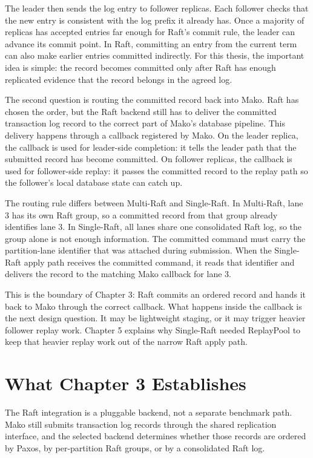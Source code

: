 The leader then sends the log entry to follower replicas. Each follower checks
that the new entry is consistent with the log prefix it already has. Once a
majority of replicas has accepted entries far enough for Raft's commit rule,
the leader can advance its commit point. In Raft, committing an entry from the
current term can also make earlier entries committed indirectly. For this
thesis, the important idea is simple: the record becomes committed only after
Raft has enough replicated evidence that the record belongs in the agreed log.

The second question is routing the committed record back into Mako. Raft has
chosen the order, but the Raft backend still has to deliver the committed
transaction log record to the correct part of Mako's database pipeline. This
delivery happens through a callback registered by Mako. On the leader replica,
the callback is used for leader-side completion: it tells the leader path that
the submitted record has become committed. On follower replicas, the callback
is used for follower-side replay: it passes the committed record to the replay
path so the follower's local database state can catch up.

The routing rule differs between Multi-Raft and Single-Raft. In Multi-Raft,
lane 3 has its own Raft group, so a committed record from that group already
identifies lane 3. In Single-Raft, all lanes share one consolidated Raft log,
so the group alone is not enough information. The committed command must carry
the partition-lane identifier that was attached during submission. When the
Single-Raft apply path receives the committed command, it reads that identifier
and delivers the record to the matching Mako callback for lane 3.

This is the boundary of Chapter 3: Raft commits an ordered record and hands it
back to Mako through the correct callback. What happens inside the callback is
the next design question. It may be lightweight staging, or it may trigger
heavier follower replay work. Chapter 5 explains why Single-Raft needed
ReplayPool to keep that heavier replay work out of the narrow Raft apply path.

\section{What Chapter 3 Establishes}

The Raft integration is a pluggable backend, not a separate benchmark path.
Mako still submits transaction log records through the shared replication
interface, and the selected backend determines whether those records are
ordered by Paxos, by per-partition Raft groups, or by a consolidated Raft log.


